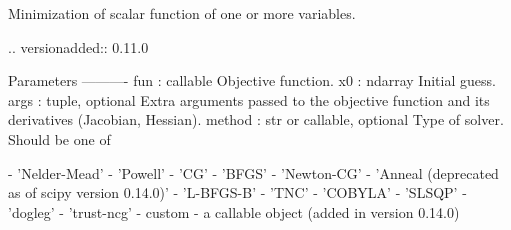 \begin{DoxyVerb}Minimization of scalar function of one or more variables.

.. versionadded:: 0.11.0

Parameters
----------
fun : callable
    Objective function.
x0 : ndarray
    Initial guess.
args : tuple, optional
    Extra arguments passed to the objective function and its
    derivatives (Jacobian, Hessian).
method : str or callable, optional
    Type of solver.  Should be one of

        - 'Nelder-Mead'
        - 'Powell'
        - 'CG'
        - 'BFGS'
        - 'Newton-CG'
        - 'Anneal (deprecated as of scipy version 0.14.0)'
        - 'L-BFGS-B'
        - 'TNC'
        - 'COBYLA'
        - 'SLSQP'
        - 'dogleg'
        - 'trust-ncg'
        - custom - a callable object (added in version 0.14.0)


\end{DoxyVerb}
